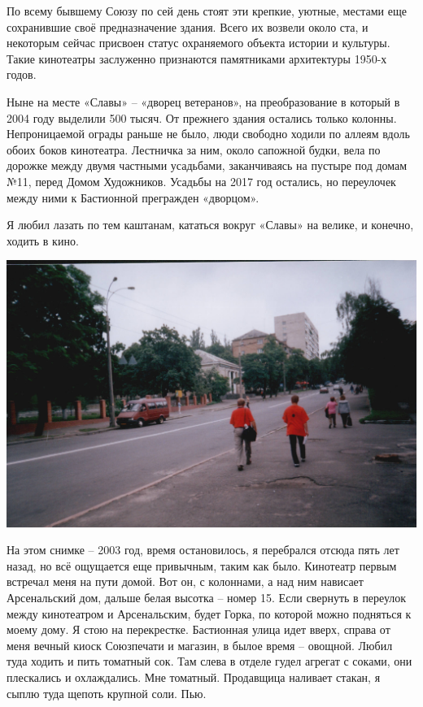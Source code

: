 По всему бывшему Союзу по сей день стоят эти крепкие, уютные, местами еще сохранившие своё предназначение здания. Всего их возвели около ста, и некоторым сейчас присвоен статус охраняемого объекта истории и культуры. Такие кинотеатры заслуженно признаются памятниками архитектуры 1950-х годов.

Ныне на месте «Славы» – «дворец ветеранов», на преобразование в который в 2004 году выделили 500 тысяч. От прежнего здания остались только колонны. Непроницаемой ограды раньше не было, люди свободно ходили по аллеям вдоль обоих боков кинотеатра. Лестничка за ним, около сапожной будки, вела по дорожке между двумя частными усадьбами, заканчиваясь на пустыре под домам №11, перед Домом Художников. Усадьбы на 2017 год остались, но переулочек между ними к Бастионной прегражден «дворцом». 

Я любил лазать по тем каштанам, кататься вокруг «Славы» на велике, и конечно, ходить в кино.

\begin{center}
\includegraphics[width=\linewidth]{chast-vosp/zver/bast-niz.jpg}
\end{center}

На этом снимке – 2003 год, время остановилось, я перебрался отсюда пять лет назад, но всё ощущается еще привычным, таким как было. Кинотеатр первым встречал меня на пути домой. Вот он, с колоннами, а над ним нависает Арсенальский дом, дальше белая высотка – номер 15. Если свернуть в переулок между кинотеатром и Арсенальским, будет Горка, по которой можно подняться к моему дому. Я стою на перекрестке. Бастионная улица идет вверх, справа от меня вечный киоск Союзпечати и магазин, в былое время – овощной. Любил туда ходить и пить томатный сок. Там слева в отделе гудел агрегат с соками, они плескались и охлаждались. Мне томатный. Продавщица наливает стакан, я сыплю туда щепоть крупной соли. Пью.

